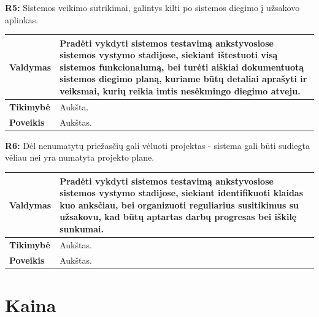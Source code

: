 \documentclass[12pt]{article}
\begin{document}
\noindent \textbf{R5:} Sistemos veikimo sutrikimai, galintys kilti po
sistemos diegimo į užsakovo aplinkas.

\label{sec:R5}
\begin{table}[htb!]
    \captionsetup{justification=centering}
    \vskip -10pt
    \begin{tabular}{|m{3cm}|m{13.7cm}|}
        \hline
        \raggedleft \textbf{\cellcolor{deepchampagne}Valdymas} &
        Pradėti vykdyti sistemos testavimą ankstyvosiose sistemos vystymo
        stadijose, siekiant ištestuoti visą sistemos funkcionalumą, bei turėti
        aiškiai dokumentuotą sistemos diegimo planą, kuriame būtų detaliai
        aprašyti ir veiksmai, kurių reikia imtis nesėkmingo diegimo atveju. \\
        \hline
        \raggedleft \textbf{\cellcolor{deepchampagne}Tikimybė} & Aukšta. \\
        \hline
        \raggedleft \textbf{\cellcolor{deepchampagne}Poveikis} & Aukštas. \\
        \hline
    \end{tabular}
\end{table}

\noindent \textbf{R6:} Dėl nenumatytų priežasčių gali vėluoti projektas -
sistema gali būti sudiegta vėliau nei yra numatyta projekto plane.
\label{sec:R6}
\begin{table}[htb!]
    \captionsetup{justification=centering}
    \vskip -10pt
    \begin{tabular}{|m{3cm}|m{13.7cm}|}
        \hline
        \raggedleft \textbf{\cellcolor{deepchampagne}Valdymas} &
        Pradėti vykdyti sistemos testavimą ankstyvosiose sistemos vystymo
        stadijose, siekiant identifikuoti klaidas kuo anksčiau, bei organizuoti
        reguliarius susitikimus su užsakovu, kad būtų aptartas darbų progresas
        bei iškilę sunkumai. \\
        \hline
        \raggedleft \textbf{\cellcolor{deepchampagne}Tikimybė} & Aukštas. \\
        \hline
        \raggedleft \textbf{\cellcolor{deepchampagne}Poveikis} & Aukštas. \\
        \hline
    \end{tabular}
\end{table}

\newpage

\section{Kaina}
\end{document}

